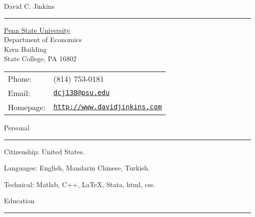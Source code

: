 \documentclass[letterpaper]{article}
\def\name{David C. Jinkins}
\renewenvironment{itemize}{
  \begin{list}{}{
    \setlength{\leftmargin}{1.5em}
  }
}{
  \end{list}
}
\begin{document}
{\huge \name}
\hrule 


\vspace{4mm}

\begin{minipage}{0.45\linewidth}
  \hspace*{5mm}\href{http://www.psu.edu/}{Penn State University} \\
  \hspace*{5mm}Department of Economics \\
  \hspace*{5mm}Kern Building \\
  \hspace*{5mm}State College, PA 16802
\end{minipage}
\begin{minipage}{0.45\linewidth}
  \begin{tabular}{ll}
    Phone: & (814) 753-0181 \\
    Email: & \href{mailto:dcj138@psu.edu}{\tt dcj138@psu.edu} \\
    Homepage: & \href{http://www.davidjinkins.com}{\tt http://www.davidjinkins.com} \\
  \end{tabular}
\end{minipage}


\vspace{7mm}
{\Large Personal}
\vspace{1mm}
 \hrule

\begin{itemize}
\item Citizenship: United States.
\item Languages: English, Mandarin Chinese, Turkish.
\item Technical: Matlab, C++, \LaTeX, Stata, html, css.
\end{itemize}

\vspace{4mm}
{\Large Education}
\vspace{1mm}
 \hrule
\end{document}
